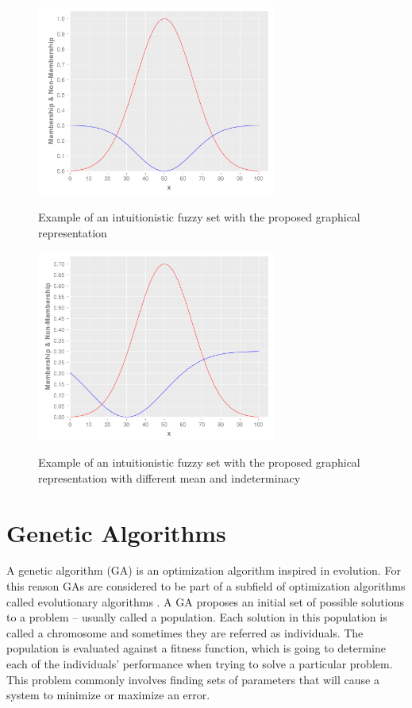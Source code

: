 \begin{figure}
\caption{Example of an intuitionistic fuzzy set with the proposed graphical
  representation} \centering \includegraphics[width=0.7\textwidth]{img/ifs.pdf}
\label{figure:ifs-proposed}
\end{figure}

\begin{figure}
\caption{Example of an intuitionistic fuzzy set with the proposed graphical
  representation with different mean and indeterminacy} \centering
\includegraphics[width=0.7\textwidth]{img/ifs-diff-mu-sd.pdf}
\label{figure:ifs-proposed-diff-mu-sd}
\end{figure}

\section{Genetic Algorithms}
\label{section:genetic-algorithms}

A genetic algorithm (GA) is an optimization algorithm inspired in evolution. For
this reason GAs are considered to be part of a subfield of optimization
algorithms called evolutionary algorithms \cite{Whitley1994}. A GA proposes an
initial set of possible solutions to a problem -- usually called a
population. Each solution in this population is called a chromosome and
sometimes they are referred as individuals. The population is evaluated against
a fitness function, which is going to determine each of the individuals'
performance when trying to solve a particular problem. This problem commonly
involves finding sets of parameters that will cause a system to minimize or
maximize an error.

